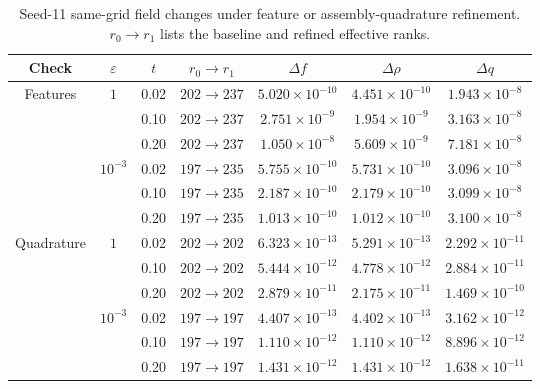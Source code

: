 \begin{table}[!htb]
\centering\small
\setlength{\tabcolsep}{3.5pt}
\caption{Seed-11 same-grid field changes under feature or assembly-quadrature refinement. $r_0\to r_1$ lists the baseline and refined effective ranks.}
\label{tab:transient-field-checks}
\begin{tabular}{ccccccc}
\toprule
Check & $\varepsilon$ & $t$ & $r_0\to r_1$ & $\Delta f$ & $\Delta\rho$ & $\Delta q$\\
\midrule
Features & $1$ & 0.02 & $202\to237$ & $5.020\times10^{-10}$ & $4.451\times10^{-10}$ & $1.943\times10^{-8}$\\
 & & 0.10 & $202\to237$ & $2.751\times10^{-9}$ & $1.954\times10^{-9}$ & $3.163\times10^{-8}$\\
 & & 0.20 & $202\to237$ & $1.050\times10^{-8}$ & $5.609\times10^{-9}$ & $7.181\times10^{-8}$\\
 & $10^{-3}$ & 0.02 & $197\to235$ & $5.755\times10^{-10}$ & $5.731\times10^{-10}$ & $3.096\times10^{-8}$\\
 & & 0.10 & $197\to235$ & $2.187\times10^{-10}$ & $2.179\times10^{-10}$ & $3.099\times10^{-8}$\\
 & & 0.20 & $197\to235$ & $1.013\times10^{-10}$ & $1.012\times10^{-10}$ & $3.100\times10^{-8}$\\
\addlinespace
Quadrature & $1$ & 0.02 & $202\to202$ & $6.323\times10^{-13}$ & $5.291\times10^{-13}$ & $2.292\times10^{-11}$\\
 & & 0.10 & $202\to202$ & $5.444\times10^{-12}$ & $4.778\times10^{-12}$ & $2.884\times10^{-11}$\\
 & & 0.20 & $202\to202$ & $2.879\times10^{-11}$ & $2.175\times10^{-11}$ & $1.469\times10^{-10}$\\
 & $10^{-3}$ & 0.02 & $197\to197$ & $4.407\times10^{-13}$ & $4.402\times10^{-13}$ & $3.162\times10^{-12}$\\
 & & 0.10 & $197\to197$ & $1.110\times10^{-12}$ & $1.110\times10^{-12}$ & $8.896\times10^{-12}$\\
 & & 0.20 & $197\to197$ & $1.431\times10^{-12}$ & $1.431\times10^{-12}$ & $1.638\times10^{-11}$\\
\bottomrule
\end{tabular}
\end{table}
